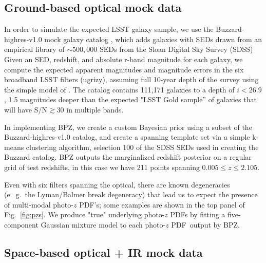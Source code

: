 \documentclass[\docopts]{\docclass}
\newcommand{\pz}{photo-$z$ PDF}
\begin{document}
\subsection{Ground-based optical mock data}
\label{sec:LSST}


In order to simulate the expected LSST galaxy sample, we use the 
Buzzard-highres-v1.0 mock galaxy catalog
, which adds galaxies with SEDs drawn from an empirical library of 
$\sim500,000$ SEDs from the Sloan Digital Sky Survey  (SDSS)
Given an SED, redshift, and absolute r-band magnitude for each galaxy, we 
compute the expected apparent magnitudes and magnitude errors in the six 
broadband LSST filters (ugrizy), assuming full 10-year depth of the survey 
using the simple model of \citet{ivezic_lsst:_2008}.  The catalog contains 
111,171 galaxies to a depth of $i<26.9$, 1.5 magnitudes deeper than the 
expected "LSST Gold sample'' of galaxies that will have S/N$\gtrsim$30 in 
multiple bands.

In implementing BPZ, we create a custom Bayesian prior using a subset of the 
Buzzard-highres-v1.0 catalog, and create a spanning template set via a simple 
k-means clustering algorithm, selection 100 of the SDSS SEDs used in creating 
the Buzzard catalog.  BPZ outputs the marginalized redshift posterior on a 
regular grid of test redshifts, in this case we have 211 points spanning 
$0.005\leq z\leq2.105$.

Even with six filters spanning the optical, there are known degeneracies 
(e.~g.~the Lyman/Balmer break degeneracy) that lead us to expect the presence 
of multi-modal \pz's; some examples are shown in the top panel of 
Fig.~\ref{fig:pzs}.  We produce "true" underlying \pz s by fitting a 
five-component Gaussian mixture model to each \pz\ output by BPZ.


\subsection{Space-based optical + IR mock data}
\label{sec:Euclid}
\end{document}
